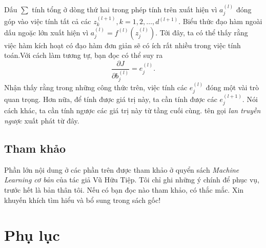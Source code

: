 \documentclass{article}
\begin{document}
Dấu $\sum$ tính tổng ở dòng thứ hai trong phép tính trên xuất hiện vì
$a_{j}^{(l)}$ {đóng góp} vào việc tính tất cả các $z_k^{(l+1)}, k = 1, 2,
\dots, d^{(l+1)}$. Biểu thức đạo hàm ngoài dấu ngoặc lớn xuất hiện vì $a_j^{(l)}  =
f^{(l)}(z_j^{(l)})$. Tới đây, ta có thể thấy rằng việc hàm kích hoạt có
đạo hàm đơn giản sẽ có ích rất nhiều trong việc tính toán.Với cách làm tương tự, bạn đọc có thể suy ra
\begin{equation}
\frac{\partial J}{\partial b_j^{(l)}} = e_j^{(l)}.
\end{equation}
Nhận thấy rằng trong những công thức trên, việc tính các $e_j^{(l)}$ đóng một vài trò quan trọng. Hơn nữa, để tính được giá trị này, ta cần tính được các $e_j^{(l+1)}$. Nói cách khác, ta cần tính {ngược} các giá trị này từ tầng cuối cùng. tên gọi \textit{lan truyền ngược} xuất phát từ đây.
 \subsection{Tham khảo}
 Phần lớn nội dung ở các phần trên được tham khảo ở quyển sách \textit{Machine Learning cơ bản} của tác giả Vũ Hữu Tiệp. Tôi chỉ ghi những ý chính để phục vụ, trước hết là bản thân tôi. Nếu có bạn đọc nào tham khảo, có thắc mắc. Xin khuyến khích tìm hiểu và bổ sung trong sách gốc!

 \section{Phụ lục}
\end{document}
